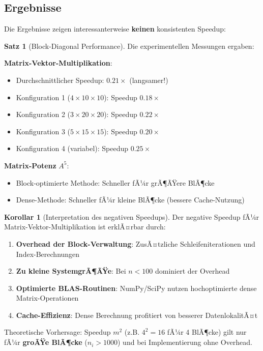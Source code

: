 ﻿\documentclass[a4paper,12pt]{report}
\theoremstyle{definition}
\newtheorem{satz}{Satz}
\newtheorem{korollar}{Korollar}
\begin{document}
	\subsection{Ergebnisse}
	
	Die Ergebnisse zeigen interessanterweise \textbf{keinen} konsistenten Speedup:
	
	\begin{satz}[Block-Diagonal Performance]
		Die experimentellen Messungen ergaben:
		
		\textbf{Matrix-Vektor-Multiplikation}:
		\begin{itemize}
			\item Durchschnittlicher Speedup: $0.21\times$ (langsamer!)
			\item Konfiguration 1 ($4 \times 10 \times 10$): Speedup $0.18\times$
			\item Konfiguration 2 ($3 \times 20 \times 20$): Speedup $0.22\times$
			\item Konfiguration 3 ($5 \times 15 \times 15$): Speedup $0.20\times$
			\item Konfiguration 4 (variabel): Speedup $0.25\times$
		\end{itemize}
		
		\textbf{Matrix-Potenz} $A^5$:
		\begin{itemize}
			\item Block-optimierte Methode: Schneller fÃ¼r grÃ¶ÃŸere BlÃ¶cke
			\item Dense-Methode: Schneller fÃ¼r kleine BlÃ¶cke (bessere Cache-Nutzung)
		\end{itemize}
	\end{satz}
	
	\begin{korollar}[Interpretation des negativen Speedups]
		Der negative Speedup fÃ¼r Matrix-Vektor-Multiplikation ist erklÃ¤rbar durch:
		\begin{enumerate}
			\item \textbf{Overhead der Block-Verwaltung}: ZusÃ¤tzliche Schleifeniterationen und Index-Berechnungen
			\item \textbf{Zu kleine SystemgrÃ¶ÃŸe}: Bei $n < 100$ dominiert der Overhead
			\item \textbf{Optimierte BLAS-Routinen}: NumPy/SciPy nutzen hochoptimierte dense Matrix-Operationen
			\item \textbf{Cache-Effizienz}: Dense Berechnung profitiert von besserer DatenlokalitÃ¤t
		\end{enumerate}
		
		Theoretische Vorhersage: Speedup $m^2$ (z.B. $4^2 = 16$ fÃ¼r 4 BlÃ¶cke) gilt nur fÃ¼r \textbf{groÃŸe BlÃ¶cke} ($n_i > 1000$) und bei Implementierung ohne Overhead.
	\end{korollar}
	
\end{document}
